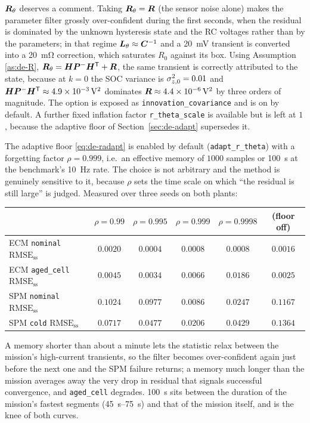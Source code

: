 $\bm{R}_\theta$ deserves a comment.  Taking $\bm{R}_\theta=\bm{R}$ (the sensor noise alone) makes the
parameter filter grossly over-confident during the first seconds, when the residual is dominated by
the unknown hysteresis state and the RC voltages rather than by the parameters; in that regime
$\bm{L}_\theta\approx\bm{C}^{-1}$ and a \SI{20}{\milli\volt} transient is converted into a
\SI{20}{\milli\ohm} correction, which saturates $R_0$ against its box.  Using Assumption
\ref{as:de-R}, $\bm{R}_\theta=\bm{H}\bm{P}^-\bm{H}^{\mathsf{T}}+\bm{R}$, the same transient is correctly attributed to the
state, because at $k=0$ the SOC variance is $\sigma_{z,0}^2=0.01$ and
$\bm{H}\bm{P}^-\bm{H}^{\mathsf{T}}\approx\SI{4.9e-3}{\volt\squared}$ dominates $\bm{R}\approx\SI{4.4e-6}{\volt\squared}$
by three orders of magnitude.  The option is exposed as \texttt{innovation\_covariance} and is on by
default.  A further fixed inflation factor \texttt{r\_theta\_scale} is available but is left at $1$,
because the adaptive floor of Section~\ref{sec:de-adapt} supersedes it.

The adaptive floor \eqref{eq:de-radapt} is enabled by default (\texttt{adapt\_r\_theta}) with a
forgetting factor $\rho=0.999$, i.e.\ an effective memory of $1000$ samples or \SI{100}{\second} at
the benchmark's \SI{10}{\hertz} rate.  The choice is not arbitrary and the method is genuinely
sensitive to it, because $\rho$ sets the time scale on which ``the residual is still large'' is
judged.  Measured over three seeds on both plants:
\begin{center}
\begin{tabular}{@{}lccccc@{}}
\toprule
 & $\rho=0.99$ & $\rho=0.995$ & $\rho=0.999$ & $\rho=0.9998$ & (floor off)\\
\midrule
ECM \texttt{nominal} $\text{RMSE}_\text{ss}$      & $0.0020$ & $0.0004$ & $0.0008$ & $0.0008$ & $0.0016$\\
ECM \texttt{aged\_cell} $\text{RMSE}_\text{ss}$   & $0.0045$ & $0.0034$ & $0.0066$ & $0.0186$ & $0.0025$\\
SPM \texttt{nominal} $\text{RMSE}_\text{ss}$      & $0.1024$ & $0.0977$ & $\mathbf{0.0086}$ & $0.0247$ & $0.1167$\\
SPM \texttt{cold} $\text{RMSE}_\text{ss}$         & $0.0717$ & $0.0477$ & $\mathbf{0.0206}$ & $0.0429$ & $0.1364$\\
\bottomrule
\end{tabular}
\end{center}
A memory shorter than about a minute lets the statistic relax between the mission's high-current
transients, so the filter becomes over-confident again just before the next one and the SPM failure
returns; a memory much longer than the mission averages away the very drop in residual that signals
successful convergence, and \texttt{aged\_cell} degrades.  \SI{100}{\second} sits between the
duration of the mission's fastest segments (\SIrange{45}{75}{\second}) and that of the mission itself,
and is the knee of both curves.

